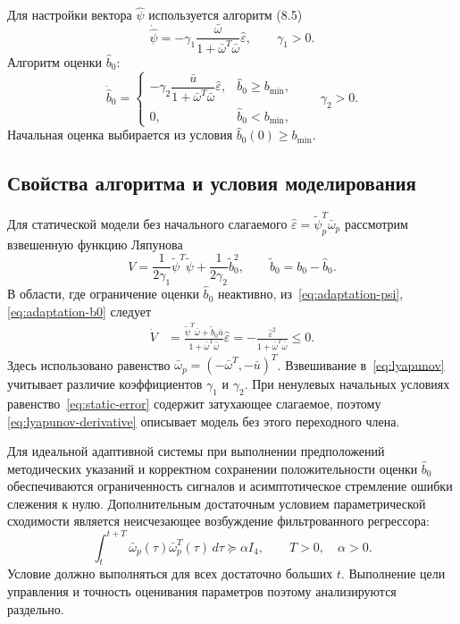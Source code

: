 Для настройки вектора $\hat\psi$ используется алгоритм (8.5)
\begin{equation}
  \dot{\hat\psi}
  =-\gamma_1\frac{\bar\omega}
    {1+\bar\omega^{T}\bar\omega}\hat\varepsilon,
  \qquad \gamma_1>0.
  \label{eq:adaptation-psi}
\end{equation}
Алгоритм оценки $\hat b_0$:
\begin{equation}
  \dot{\hat b}_0=
  \begin{cases}
    -\gamma_2\dfrac{\bar u}
      {1+\bar\omega^{T}\bar\omega}\hat\varepsilon,
      & \hat b_0\ge b_{\min},\\[1em]
    0, & \hat b_0<b_{\min},
  \end{cases}
  \qquad \gamma_2>0.
  \label{eq:adaptation-b0}
\end{equation}
Начальная оценка выбирается из условия $\hat b_0(0)\ge b_{\min}$.


\subsection{Свойства алгоритма и условия моделирования}

Для статической модели без начального слагаемого
$\hat\varepsilon=\tilde\psi_p^{T}\bar\omega_p$
рассмотрим взвешенную функцию Ляпунова
\begin{equation}
  V=\frac{1}{2\gamma_1}\tilde\psi^{T}\tilde\psi
    +\frac{1}{2\gamma_2}\tilde b_0^2,
  \qquad \tilde b_0=b_0-\hat b_0.
  \label{eq:lyapunov}
\end{equation}
В области, где ограничение оценки $\hat b_0$ неактивно,
из~\eqref{eq:adaptation-psi}, \eqref{eq:adaptation-b0} следует
\begin{equation}
  \begin{aligned}
    \dot V
      &=\frac{\tilde\psi^{T}\bar\omega+\tilde b_0\bar u}
        {1+\bar\omega^{T}\bar\omega}\hat\varepsilon=-\frac{\hat\varepsilon^2}
        {1+\bar\omega^{T}\bar\omega}\le0.
  \end{aligned}
  \label{eq:lyapunov-derivative}
\end{equation}
Здесь использовано равенство
$\bar\omega_p=(-\bar\omega^{T},-\bar u)^{T}$.
Взвешивание в~\eqref{eq:lyapunov} учитывает различие
коэффициентов $\gamma_1$ и $\gamma_2$.
При ненулевых начальных условиях равенство~\eqref{eq:static-error}
содержит затухающее слагаемое, поэтому
\eqref{eq:lyapunov-derivative} описывает модель без этого переходного члена.

Для идеальной адаптивной системы при выполнении предположений
методических указаний и корректном сохранении положительности
оценки $\hat b_0$ обеспечиваются ограниченность сигналов
и асимптотическое стремление ошибки слежения к нулю.
Дополнительным достаточным условием параметрической сходимости
является неисчезающее возбуждение фильтрованного регрессора:
\begin{equation}
  \int_t^{t+T}\bar\omega_p(\tau)\bar\omega_p^{T}(\tau)\,d\tau
  \succeq\alpha I_4,
  \qquad T>0,\quad\alpha>0.
  \label{eq:pe}
\end{equation}
Условие должно выполняться для всех достаточно больших $t$.
Выполнение цели управления и точность оценивания параметров
поэтому анализируются раздельно.

